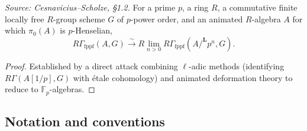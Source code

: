 \begin{theorem}
  \label{thm:p_adic_continuity}
  \textit{Source: Cesnavicius--Scholze, §1.2.}
  For a prime \(p\), a ring \(R\), a commutative finite locally free \(R\)-group scheme \(G\) of \(p\)-power order, and an animated \(R\)-algebra \(A\) for which \(\pi_0(A)\) is \(p\)-Henselian,
  \[
    R\Gamma_{\mathrm{fppf}}(A, G) \xrightarrow{\sim} R\lim_{n > 0} R\Gamma_{\mathrm{fppf}}(A/^{\mathbf{L}} p^n, G).
  \]
\end{theorem}

\begin{proof}
  \uses{}
  Established by a direct attack combining \(\ell\)-adic methods (identifying \(R\Gamma(A[1/p], G)\) with étale cohomology) and animated deformation theory to reduce to \(\mathbb{F}_p\)-algebras.
\end{proof}

\subsection{Notation and conventions}

